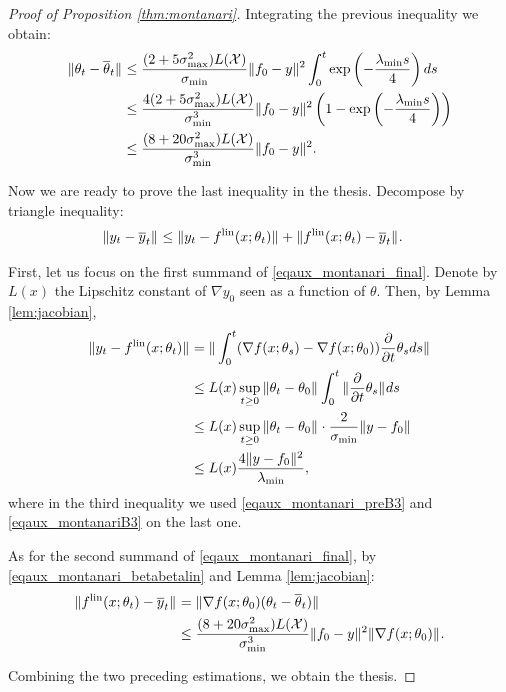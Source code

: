 \documentclass{article}
\theoremstyle{definition}
\theoremstyle{remark}
\numberwithin{equation}{section}
\newcommand{\X}{\mathcal{X}}
\newcommand{\lin}{{\textup{lin}}}
\newcommand{\lammin}{\lambda_{\textup{min}}}
\newcommand{\sigmin}{\sigma_{\textup{min}}}
\newcommand{\sigmax}{\sigma_{\textup{max}}}
\newcommand{\norm}[2]{
    \|#1\|_{#2}
}
\begin{document}
\begin{proof}[Proof of Proposition \ref{thm:montanari}]
Integrating the previous inequality we obtain:
\begin{align}
    \norm{\theta_t-\overline \theta_t}{} &\le \frac{ (2+5\sigmax^2)L(\X)}{\sigmin} \norm{f_0-y}{}^2 \int_0^t \exp\left(-\frac{\lammin s}{4}\right)ds \\
    &\le \frac{ 4 (2+5\sigmax^2)L(\X)}{\sigmin^3} \norm{f_0-y}{}^2 \left(1- \exp\left(-\frac{\lammin s}{4}\right)\right)\\
    \label{eqaux_montanari_betabetalin}  &\le \frac{(8+20\sigmax^2)L(\X)}{\sigmin^3} \norm{f_0-y}{}^2.
\end{align}

    Now we are ready to prove the last inequality in the thesis. 
    Decompose by triangle inequality:
    \begin{align}
    \label{eqaux_montanari_final}
        \norm{y_t-\overline y_t}{} &\le \norm{y_t-f^\lin(x;\theta_t)}{}+\norm{f^\lin(x;\theta_t)-\overline y_t}{}.
    \end{align}

    First, let us focus on the first summand of \eqref{eqaux_montanari_final}.
    Denote by $L(x)$ the Lipschitz constant of $\nabla y_0$ seen as a function of $\theta$.
    Then, by Lemma \ref{lem:jacobian},
    \begin{align}
        \norm{y_t-f^\lin(x;\theta_t)}{} &= \norm{\int_0^t(\nabla f(x;\theta_s)-\nabla f(x;\theta_0))\frac{\partial}{\partial t} \theta_sds}{}\\
        &\le L(x) \sup_{t \ge 0}\norm{\theta_t-\theta_0}{}\int_0^t \norm{\frac{\partial}{\partial t} \theta_s}{}ds\\
        &\le L(x) \sup_{t \ge 0}\norm{\theta_t-\theta_0}{} \cdot \frac{2}{\sigmin} \norm{y-f_0}{}\\
        &\le L(x) \frac{4 \norm{y-f_0}{}^2}{\lammin},
    \end{align}
    where in the third inequality we used \eqref{eqaux_montanari_preB3} and \eqref{eqaux_montanariB3} on the last one.

    As for the second summand of \eqref{eqaux_montanari_final}, by \eqref{eqaux_montanari_betabetalin} and Lemma \ref{lem:jacobian}:
    \begin{align}
        \norm{f^\lin(x;\theta_t)-\overline y_t}{} &= \norm{\nabla f(x;\theta_0)(\theta_t-\overline \theta_t)}{}\\
        &\le \frac{(8+20\sigmax^2)L(\X)}{\sigmin^3} \norm{f_0-y}{}^2 \norm{\nabla f(x;\theta_0)}{}.
    \end{align}
 
Combining the two preceding estimations, we obtain the thesis.

\end{proof}
\end{document}
